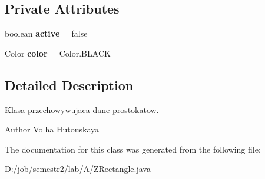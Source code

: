 \subsection*{Private Attributes}
\begin{DoxyCompactItemize}
\item 
\mbox{\label{class_z_rectangle_a26796b0689b4c9697b279d80e6bd3165}} 
boolean {\bfseries active} = false
\item 
\mbox{\label{class_z_rectangle_abdd8c9c5e161fd801f22f4c3333192e3}} 
Color {\bfseries color} = Color.\+B\+L\+A\+CK
\end{DoxyCompactItemize}


\subsection{Detailed Description}
Klasa przechowywujaca dane prostokatow.

\begin{DoxyAuthor}{Author}
Volha Hutouskaya 
\end{DoxyAuthor}


The documentation for this class was generated from the following file\+:\begin{DoxyCompactItemize}
\item 
D\+:/job/semestr2/lab/\+A/Z\+Rectangle.\+java\end{DoxyCompactItemize}
